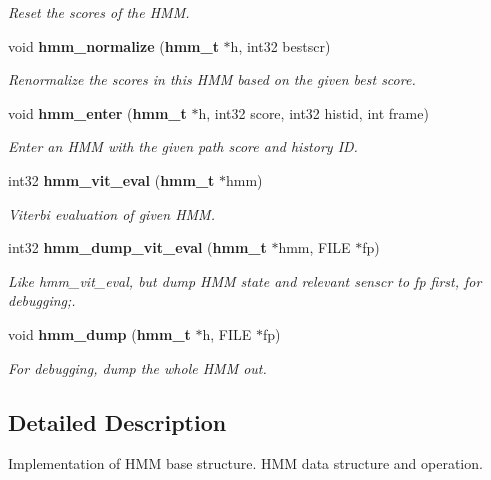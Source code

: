 \begin{DoxyCompactItemize}
\begin{DoxyCompactList}\small\item\em Reset the scores of the H\-M\-M. \end{DoxyCompactList}\item 
void {\bf hmm\-\_\-normalize} ({\bf hmm\-\_\-t} $\ast$h, int32 bestscr)\label{hmm_8h_a0438bc7672ff9200274ffe7b5051eb92}

\begin{DoxyCompactList}\small\item\em Renormalize the scores in this H\-M\-M based on the given best score. \end{DoxyCompactList}\item 
void {\bf hmm\-\_\-enter} ({\bf hmm\-\_\-t} $\ast$h, int32 score, int32 histid, int frame)\label{hmm_8h_a7285d01d533996d750c78e0d96042716}

\begin{DoxyCompactList}\small\item\em Enter an H\-M\-M with the given path score and history I\-D. \end{DoxyCompactList}\item 
int32 {\bf hmm\-\_\-vit\-\_\-eval} ({\bf hmm\-\_\-t} $\ast$hmm)
\begin{DoxyCompactList}\small\item\em Viterbi evaluation of given H\-M\-M. \end{DoxyCompactList}\item 
int32 {\bf hmm\-\_\-dump\-\_\-vit\-\_\-eval} ({\bf hmm\-\_\-t} $\ast$hmm, F\-I\-L\-E $\ast$fp)
\begin{DoxyCompactList}\small\item\em Like hmm\-\_\-vit\-\_\-eval, but dump H\-M\-M state and relevant senscr to fp first, for debugging;. \end{DoxyCompactList}\item 
void {\bf hmm\-\_\-dump} ({\bf hmm\-\_\-t} $\ast$h, F\-I\-L\-E $\ast$fp)
\begin{DoxyCompactList}\small\item\em For debugging, dump the whole H\-M\-M out. \end{DoxyCompactList}\end{DoxyCompactItemize}


\subsection{Detailed Description}
Implementation of H\-M\-M base structure. H\-M\-M data structure and operation.

